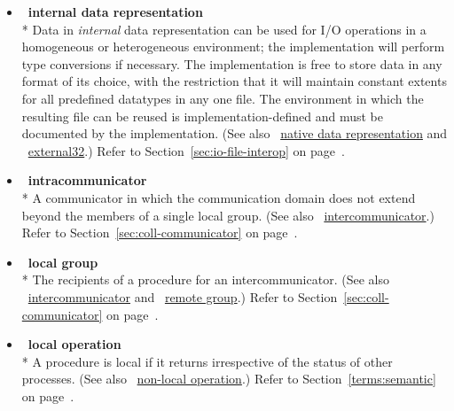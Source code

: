 \begin{itemize}
\label{glossary:internal_data_representation}
\item  ~\hypertarget{glossary:internal_data_representation}{\textbf{internal data representation}} \\*
Data in \emph{internal} data representation can be used for I/O operations in a homogeneous or
heterogeneous environment; the implementation will perform type
conversions if necessary. The implementation is free to store data in
any format of its choice,
with the restriction that it will maintain constant extents
for all predefined datatypes in any one file.
The environment in which the resulting file 
can be reused is implementation-defined
and must be documented by the implementation.
(See also ~\hyperlink{glossary:native_data_representation}{native data representation} and ~\hyperlink{glossary:external32}{external32}.)
Refer to Section~\ref{sec:io-file-interop} on page~\pageref{sec:io-file-interop}.

\label{glossary:intracommunicator}
\item  ~\hypertarget{glossary:intracommunicator}{\textbf{intracommunicator}} \\*
A communicator in which the communication domain does not extend beyond the members of a single local group. 
(See also ~\hyperlink{glossary:intercommunicator}{intercommunicator}.)
Refer to Section~\ref{sec:coll-communicator} on page~\pageref{sec:coll-communicator}.

\label{glossary:local_group}
\item  ~\hypertarget{glossary:local_group}{\textbf{local group}} \\*
The recipients of a procedure for an intercommunicator. 
(See also ~\hyperlink{glossary:intercommunicator}{intercommunicator} and
~\hyperlink{glossary:remote_group}{remote group}.)
Refer to Section~\ref{sec:coll-communicator} on page~\pageref{sec:coll-communicator}.

\label{glossary:local operation}
\item  ~\hypertarget{glossary:local_operation}{\textbf{local operation}} \\*
A procedure is local if 
it returns irrespective of the status of other processes.
(See also ~\hyperlink{glossary:non-local_operation}{non-local operation}.)
Refer to Section~\ref{terms:semantic} on page~\pageref{terms:semantic}.


\end{itemize}
